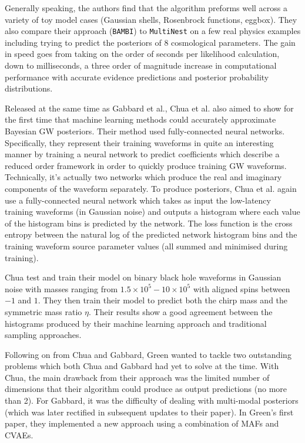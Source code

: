 Generally speaking, the authors find that the algorithm preforms well across a variety of toy model cases (Gaussian shells, Rosenbrock functions, eggbox).  They also compare their approach (\texttt{BAMBI}) to \texttt{MultiNest} on a few real physics examples including trying to predict the posteriors of 8 cosmological parameters. The gain in speed goes from taking on the order of seconds per likelihood calculation, down to milliseconds, a three order of magnitude increase in computational performance with accurate evidence predictions and posterior probability distributions\cite{10.1111/j.1365-2966.2011.20288.x}.

%
% 

Released at the same time as Gabbard et al., Chua et al. also aimed to show for the first time that machine learning methods could accurately approximate Bayesian \ac{GW} posteriors. Their method used fully-connected neural networks. Specifically, they represent their training waveforms in quite an interesting manner by training a neural network to predict coefficients which describe a reduced order framework in order to quickly produce training \ac{GW} waveforms. Technically, it's actually two networks which produce the real and imaginary components of the waveform separately. To produce posteriors, Chua et al. again use a fully-connected neural network which takes as input the low-latency training waveforms (in Gaussian noise) and outputs a histogram where each value of the histogram bins is predicted by the network. The loss function is the cross entropy between the natural log of the predicted network histogram bins and the training waveform source parameter values (all summed and minimised during training).

Chua test and train their model on binary black hole waveforms in Gaussian noise with masses ranging from $1.5 \times 10^5 - 10 \times 10^5$ with aligned spins between $-1$ and $1$. They then train their model to predict both the chirp mass and the symmetric mass ratio $\eta$. Their results show a good agreement between the histograms produced by their machine learning approach and traditional sampling approaches\cite{2019arXiv190905966C,PhysRevLett.122.211101}.

%
%

Following on from Chua and Gabbard, Green wanted to tackle two outstanding problems which both Chua and Gabbard had yet to solve at the time. With Chua, the main drawback from their approach was the limited number of dimensions that their algorithm could produce as output predictions (no more than 2). For Gabbard, it was the difficulty of dealing with multi-modal posteriors (which was later rectified in subsequent updates to their paper). In Green's first paper, they implemented a new approach using a combination of \ac{MAF}s and \ac{CVAE}s. 

